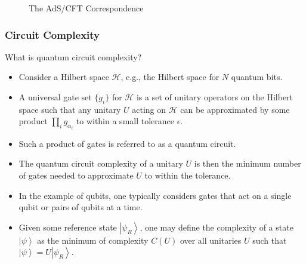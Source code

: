\documentclass[10pt,aspectratio=169]{beamer}
\newcommand{\ket}[1]{\left| #1 \right>}
\begin{document}
\begin{frame}
\begin{minipage}[t]{0.48\linewidth}
\begin{figure}
\begin{center}
    \end{center}
    \caption{The AdS/CFT Correspondence}
    \label{fig:WDW}
\end{figure}

\end{minipage}

\end{frame}

\begin{frame}
\frametitle{Circuit Complexity}

What is quantum circuit complexity?

\begin{itemize}

\item Consider a Hilbert space $\mathcal{H}$, e.g., the Hilbert space for $N$ quantum bits.

\item A universal gate set $\{g_i\}$ for $\mathcal{H}$ is a set of unitary operators on the Hilbert space such that any unitary $U$ acting on $\mathcal{H}$ can be approximated by some product $\displaystyle\prod_{i} g_{\alpha_i}$ to within a small tolerance $\epsilon$. 

\item Such a product of gates is referred to as a quantum circuit.

\item The quantum circuit complexity of a unitary $U$ is then the minimum number of gates needed to approximate $U$ to within the tolerance.

\item In the example of qubits, one typically considers gates that act on a single qubit or pairs of qubits at a time.

\item Given some reference state $\ket{\psi_R}$, one may define the complexity of a state $\ket{\psi}$ as the minimum of complexity $C(U)$ over all unitaries $U$ such that $\ket{\psi} = U\ket{\psi_R}$.

\end{itemize}

\end{frame}
\end{document}

